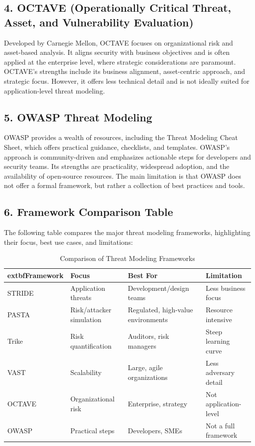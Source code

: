 \subsection*{4. OCTAVE (Operationally Critical Threat, Asset, and Vulnerability Evaluation)}
Developed by Carnegie Mellon, OCTAVE focuses on organizational risk and asset-based analysis. It aligns security with business objectives and is often applied at the enterprise level, where strategic considerations are paramount\cite{nist800154}. OCTAVE’s strengths include its business alignment, asset-centric approach, and strategic focus. However, it offers less technical detail and is not ideally suited for application-level threat modeling.

\subsection*{5. OWASP Threat Modeling}
OWASP provides a wealth of resources, including the Threat Modeling Cheat Sheet, which offers practical guidance, checklists, and templates. OWASP’s approach is community-driven and emphasizes actionable steps for developers and security teams\cite{owasp}. Its strengths are practicality, widespread adoption, and the availability of open-source resources. The main limitation is that OWASP does not offer a formal framework, but rather a collection of best practices and tools.

\subsection*{6. Framework Comparison Table}
The following table compares the major threat modeling frameworks, highlighting their focus, best use cases, and limitations:
\begin{table}[H]
\centering
\begin{tabular}{|l|l|l|l|}
\hline
		extbf{Framework} & \textbf{Focus} & \textbf{Best For} & \textbf{Limitation} \\
\hline
STRIDE & Application threats & Development/design teams & Less business focus \\
PASTA & Risk/attacker simulation & Regulated, high-value environments & Resource intensive \\
Trike & Risk quantification & Auditors, risk managers & Steep learning curve \\
VAST & Scalability & Large, agile organizations & Less adversary detail \\
OCTAVE & Organizational risk & Enterprise, strategy & Not application-level \\
OWASP & Practical steps & Developers, SMEs & Not a full framework \\
\hline
\end{tabular}
\caption{Comparison of Threat Modeling Frameworks\cite{owasp,uceda2015,nist800154}}
\end{table}

